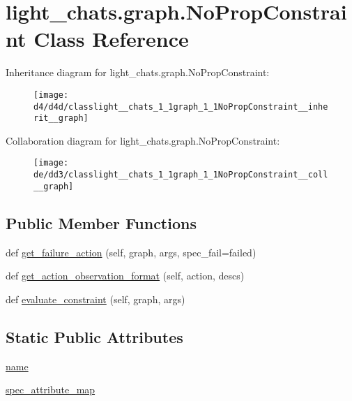 \hypertarget{classlight__chats_1_1graph_1_1NoPropConstraint}{}\section{light\+\_\+chats.\+graph.\+No\+Prop\+Constraint Class Reference}
\label{classlight__chats_1_1graph_1_1NoPropConstraint}


Inheritance diagram for light\+\_\+chats.\+graph.\+No\+Prop\+Constraint\+:
\nopagebreak
\begin{figure}[H]
\begin{center}
\leavevmode
\texttt{[image: d4/d4d/classlight\_\_chats\_1\_1graph\_1\_1NoPropConstraint\_\_inherit\_\_graph]}
\end{center}
\end{figure}


Collaboration diagram for light\+\_\+chats.\+graph.\+No\+Prop\+Constraint\+:
\nopagebreak
\begin{figure}[H]
\begin{center}
\leavevmode
\texttt{[image: de/dd3/classlight\_\_chats\_1\_1graph\_1\_1NoPropConstraint\_\_coll\_\_graph]}
\end{center}
\end{figure}
\subsection*{Public Member Functions}
\begin{DoxyCompactItemize}
\item 
def \hyperlink{classlight__chats_1_1graph_1_1NoPropConstraint_ad9fd1275af02f384bd55ceaebc6ee59c}{get\+\_\+failure\+\_\+action} (self, graph, args, spec\+\_\+fail=\textquotesingle{}failed\textquotesingle{})
\item 
def \hyperlink{classlight__chats_1_1graph_1_1NoPropConstraint_a7d3ef98c6d1eea452e44c426a9498015}{get\+\_\+action\+\_\+observation\+\_\+format} (self, action, descs)
\item 
def \hyperlink{classlight__chats_1_1graph_1_1NoPropConstraint_a9a109d3e7b10297b01d79409838be126}{evaluate\+\_\+constraint} (self, graph, args)
\end{DoxyCompactItemize}
\subsection*{Static Public Attributes}
\begin{DoxyCompactItemize}
\item 
\hyperlink{classlight__chats_1_1graph_1_1NoPropConstraint_a203bf64e3c9ae237a63a23a893df6a0f}{name}
\item 
\hyperlink{classlight__chats_1_1graph_1_1NoPropConstraint_a10464e1a8f8bc8216bd0d36c9cdd38dd}{spec\+\_\+attribute\+\_\+map}
\end{DoxyCompactItemize}


